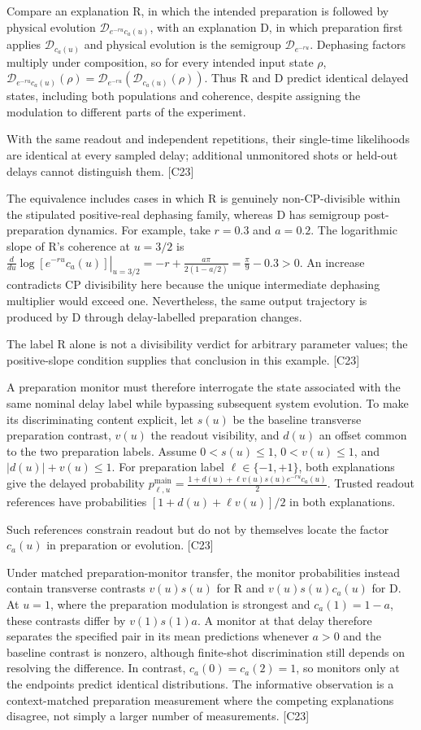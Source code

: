 \documentclass[11pt]{article}
\begin{document}
Compare an explanation R, in which the intended preparation is followed by physical evolution $\mathcal D_{e^{-ru}c_a(u)}$, with an explanation D, in which preparation first applies $\mathcal D_{c_a(u)}$ and physical evolution is the semigroup $\mathcal D_{e^{-ru}}$. Dephasing factors multiply under composition, so for every intended input state $\rho$,
$\mathcal D_{e^{-ru}c_a(u)}(\rho)=\mathcal D_{e^{-ru}}\!\left(\mathcal D_{c_a(u)}(\rho)\right).$
Thus R and D predict identical delayed states, including both populations and coherence, despite assigning the modulation to different parts of the experiment.

With the same readout and independent repetitions, their single-time likelihoods are identical at every sampled delay; additional unmonitored shots or held-out delays cannot distinguish them. [C23]

The equivalence includes cases in which R is genuinely non-CP-divisible within the stipulated positive-real dephasing family, whereas D has semigroup post-preparation dynamics. For example, take $r=0.3$ and $a=0.2$. The logarithmic slope of R's coherence at $u=3/2$ is
$\left.\frac{d}{du}\log\!\left[e^{-ru}c_a(u)\right]\right|_{u=3/2}=-r+\frac{a\pi}{2(1-a/2)}=\frac{\pi}{9}-0.3>0.$
An increase contradicts CP divisibility here because the unique intermediate dephasing multiplier would exceed one. Nevertheless, the same output trajectory is produced by D through delay-labelled preparation changes.

The label R alone is not a divisibility verdict for arbitrary parameter values; the positive-slope condition supplies that conclusion in this example. [C23]

A preparation monitor must therefore interrogate the state associated with the same nominal delay label while bypassing subsequent system evolution. To make its discriminating content explicit, let $s(u)$ be the baseline transverse preparation contrast, $v(u)$ the readout visibility, and $d(u)$ an offset common to the two preparation labels. Assume $0<s(u)\leq1$, $0<v(u)\leq1$, and $|d(u)|+v(u)\leq1$. For preparation label $\ell\in\{-1,+1\}$, both explanations give the delayed probability
$p_{\ell,u}^{\mathrm{main}}=\frac{1+d(u)+\ell v(u)s(u)e^{-ru}c_a(u)}{2}.$
Trusted readout references have probabilities $[1+d(u)+\ell v(u)]/2$ in both explanations.

Such references constrain readout but do not by themselves locate the factor $c_a(u)$ in preparation or evolution. [C23]

Under matched preparation-monitor transfer, the monitor probabilities instead contain transverse contrasts $v(u)s(u)$ for R and $v(u)s(u)c_a(u)$ for D. At $u=1$, where the preparation modulation is strongest and $c_a(1)=1-a$, these contrasts differ by $v(1)s(1)a$. A monitor at that delay therefore separates the specified pair in its mean predictions whenever $a>0$ and the baseline contrast is nonzero, although finite-shot discrimination still depends on resolving the difference. In contrast, $c_a(0)=c_a(2)=1$, so monitors only at the endpoints predict identical distributions. The informative observation is a context-matched preparation measurement where the competing explanations disagree, not simply a larger number of measurements. [C23]
\end{document}
